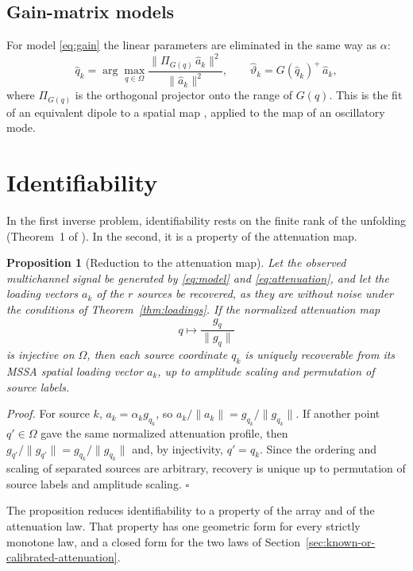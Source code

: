 \documentclass{article}
\newtheorem{proposition}{\bf Proposition}
\begin{document}
\subsection{Gain-matrix models}\label{sec:gain-matrix-models}

For model \eqref{eq:gain} the linear parameters are eliminated in the same way as $\alpha$: \[
\widehat{q}_k = \arg\max_{q \in \Omega} \frac{\lVert \Pi_{G(q)}\, \widehat{a}_k \rVert^{2}}{\lVert \widehat{a}_k \rVert^{2}}, \qquad \widehat{\vartheta}_k = G(\widehat{q}_k)^{+}\, \widehat{a}_k ,
\] where $\Pi_{G(q)}$ is the orthogonal projector onto the range of $G(q)$. This is the fit of an equivalent dipole to a spatial map \cite{ref-Mosher01, ref-Delorme}, applied to the map of an oscillatory mode.

\section{Identifiability}\label{sec:identifiability}

In the first inverse problem, identifiability rests on the finite rank of the unfolding \cite{ref-BernadotteBuchstaber, ref-Bernadotte05} (Theorem~1 of \cite{ref-companionA}). In the second, it is a property of the attenuation map.

\begin{proposition}[Reduction to the attenuation map] \label{prop:reduction}
Let the observed multichannel signal be generated by \eqref{eq:model} and \eqref{eq:attenuation}, and let the loading vectors $a_k$ of the $r$ sources be recovered, as they are without noise under the conditions of Theorem~\ref{thm:loadings}. If the normalized attenuation map \[
q \mapsto \frac{g_q}{\lVert g_q \rVert}
\] is injective on $\Omega$, then each source coordinate $q_k$ is uniquely recoverable from its MSSA spatial loading vector $a_k$, up to amplitude scaling and permutation of source labels.
\end{proposition}

\textit{Proof.} For source $k$, $a_k = \alpha_k g_{q_k}$, so $a_k / \lVert a_k \rVert = g_{q_k} / \lVert g_{q_k} \rVert$. If another point $q' \in \Omega$ gave the same normalized attenuation profile, then $g_{q'} / \lVert g_{q'} \rVert = g_{q_k} / \lVert g_{q_k} \rVert$ and, by injectivity, $q' = q_k$. Since the ordering and scaling of separated sources are arbitrary, recovery is unique up to permutation of source labels and amplitude scaling. $\square$

The proposition reduces identifiability to a property of the array and of the attenuation law. That property has one geometric form for every strictly monotone law, and a closed form for the two laws of Section~\ref{sec:known-or-calibrated-attenuation}.
\end{document}
